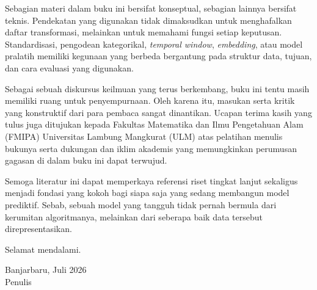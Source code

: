 Sebagian materi dalam buku ini bersifat konseptual, sebagian lainnya bersifat teknis. Pendekatan yang digunakan tidak dimaksudkan untuk menghafalkan daftar transformasi, melainkan untuk memahami fungsi setiap keputusan. Standardisasi, pengodean kategorikal, \emph{temporal window}, \emph{embedding}, atau model pralatih memiliki kegunaan yang berbeda bergantung pada struktur data, tujuan, dan cara evaluasi yang digunakan.

Sebagai sebuah diskursus keilmuan yang terus berkembang, buku ini tentu masih memiliki ruang untuk penyempurnaan. Oleh karena itu, masukan serta kritik yang konstruktif dari para pembaca sangat dinantikan. Ucapan terima kasih yang tulus juga ditujukan kepada Fakultas Matematika dan Ilmu Pengetahuan Alam (FMIPA) Universitas Lambung Mangkurat (ULM) atas pelatihan menulis bukunya serta dukungan dan iklim akademis yang memungkinkan perumusan gagasan di dalam buku ini dapat terwujud.

Semoga literatur ini dapat memperkaya referensi riset tingkat lanjut sekaligus menjadi fondasi yang kokoh bagi siapa saja yang sedang membangun model prediktif. Sebab, sebuah model yang tangguh tidak pernah bermula dari kerumitan algoritmanya, melainkan dari seberapa baik data tersebut direpresentasikan.

Selamat mendalami.

\begin{flushright}
Banjarbaru, Juli 2026\\
Penulis
\end{flushright}

\endgroup
